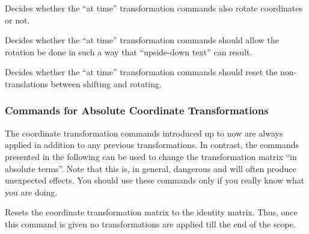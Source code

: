 {
    \let\ifpgfslopedattime=\relax
    \begin{textoken}{\ifpgfslopedattime}
        Decides whether the ``at time'' transformation commands also rotate
        coordinates or not.
    \end{textoken}
}
{
    \let\ifpgfallowupsidedowattime=\relax
    \begin{textoken}{\ifpgfallowupsidedowattime}
        Decides whether the ``at time'' transformation commands should allow
        the rotation be done in such a way that ``upside-down text'' can
        result.
    \end{textoken}
}
{
    \let\ifpgfresetnontranslationsattime=\relax
    \begin{textoken}{\ifpgfresetnontranslationsattime}
        Decides whether the ``at time'' transformation commands should reset
        the non-translations between shifting and rotating.
    \end{textoken}
}


\subsubsection{Commands for Absolute Coordinate Transformations}

The coordinate transformation commands introduced up to now are always applied
in addition to any previous transformations. In contrast, the commands
presented in the following can be used to change the transformation matrix ``in
absolute terms''. Note that this is, in general, dangerous and will often
produce unexpected effects. You should use these commands only if you really
know what you are doing.

\begin{command}{\pgftransformreset}
    Resets the coordinate transformation matrix to the identity matrix. Thus,
    once this command is given no transformations are applied till the end of
    the scope.
\begin{codeexample}[]
\end{codeexample}
\end{command}

